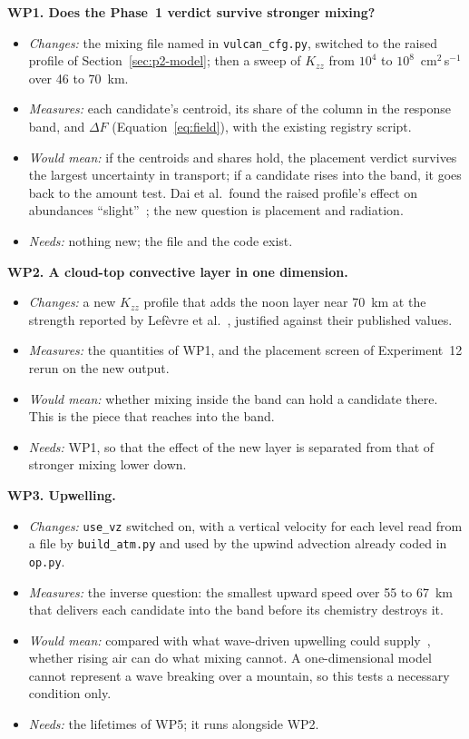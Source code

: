 \newpage
\textbf{WP1. Does the Phase~1 verdict survive stronger mixing?}
\nopagebreak[4]
\begin{itemize}[leftmargin=*, itemsep=1pt, topsep=2pt]
  \item \emph{Changes:} the mixing file named in \texttt{vulcan\_cfg.py}, switched to the
    raised profile of Section~\ref{sec:p2-model}; then a sweep of $K_{zz}$ from $10^{4}$
    to $10^{8}$~cm$^{2}$\,s$^{-1}$ over 46 to 70~km.
  \item \emph{Measures:} each candidate's centroid, its share of the column in the
    response band, and $\Delta F$ (Equation~\eqref{eq:field}), with the existing
    registry script.
  \item \emph{Would mean:} if the centroids and shares hold, the placement verdict
    survives the largest uncertainty in transport; if a candidate rises into the band,
    it goes back to the amount test. Dai et al.\ found the raised profile's effect on
    abundances ``slight''~\cite{dai2024}; the new question is placement and radiation.
  \item \emph{Needs:} nothing new; the file and the code exist.
\end{itemize}

\textbf{WP2. A cloud-top convective layer in one dimension.}
\nopagebreak[4]
\begin{itemize}[leftmargin=*, itemsep=1pt, topsep=2pt]
  \item \emph{Changes:} a new $K_{zz}$ profile that adds the noon layer near 70~km at
    the strength reported by Lef\`evre et al.~\cite{lefevre2022, lefevre2024}, justified
    against their published values.
  \item \emph{Measures:} the quantities of WP1, and the placement screen of
    Experiment~12 rerun on the new output.
  \item \emph{Would mean:} whether mixing inside the band can hold a candidate there.
    This is the piece that reaches into the band.
  \item \emph{Needs:} WP1, so that the effect of the new layer is separated from that of
    stronger mixing lower down.
\end{itemize}

\textbf{WP3. Upwelling.}
\nopagebreak[4]
\begin{itemize}[leftmargin=*, itemsep=1pt, topsep=2pt]
  \item \emph{Changes:} \texttt{use\_vz} switched on, with a vertical velocity for each
    level read from a file by \texttt{build\_atm.py} and used by the upwind advection
    already coded in \texttt{op.py}.
  \item \emph{Measures:} the inverse question: the smallest upward speed over 55 to
    67~km that delivers each candidate into the band before its chemistry destroys it.
  \item \emph{Would mean:} compared with what wave-driven upwelling could
    supply~\cite{bertaux2016}, whether rising air can do what mixing cannot. A
    one-dimensional model cannot represent a wave breaking over a mountain, so this
    tests a necessary condition only.
  \item \emph{Needs:} the lifetimes of WP5; it runs alongside WP2.
\end{itemize}

